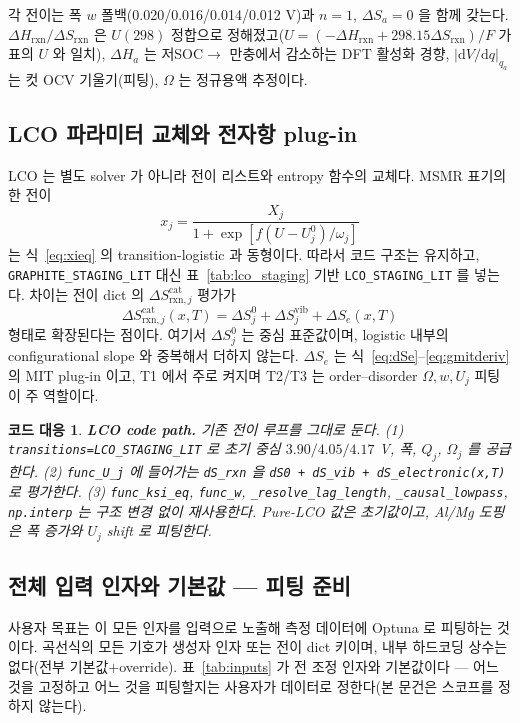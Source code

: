 \documentclass[11pt,a4paper]{article}
\newtheorem*{codebox}{코드 대응}
\newcommand{\dd}{\mathrm{d}}
\newcommand{\rxn}{\mathrm{rxn}}
\newcommand{\code}[1]{\texttt{#1}}
\begin{document}
각 전이는 폭 $w$ 폴백(0.020/0.016/0.014/0.012 V)과 $n=1$, $\Delta S_a=0$ 을 함께 갖는다. $\Delta H_\rxn/\Delta S_\rxn$
은 $U(298)$ 정합으로 정해졌고($U=(-\Delta H_\rxn+298.15\Delta S_\rxn)/F$ 가 표의 $U$ 와 일치), $\Delta H_a$ 는 저SOC$\to$
만충에서 감소하는 DFT 활성화 경향, $|\dd V/\dd q|_{q_a}$ 는 컷 OCV 기울기(피팅), $\Omega$ 는 정규용액 추정이다.

\subsection{LCO 파라미터 교체와 전자항 plug-in}
LCO 는 별도 solver 가 아니라 전이 리스트와 entropy 함수의 교체다. MSMR 표기의 한 전이
\begin{equation}
x_j=\frac{X_j}{1+\exp[f(U-U_j^0)/\omega_j]}
\label{eq:msmrhomology}
\end{equation}
는 식~\eqref{eq:xieq} 의 transition-logistic 과 동형이다. 따라서 코드 구조는 유지하고,
\code{GRAPHITE\_STAGING\_LIT} 대신 표~\ref{tab:lco_staging} 기반 \code{LCO\_STAGING\_LIT} 를 넣는다. 차이는
전이 dict 의 $\Delta S_{\rxn,j}^\mathrm{cat}$ 평가가
\begin{equation}
\Delta S_{\rxn,j}^\mathrm{cat}(x,T)
=\Delta S_j^0+\Delta S_j^\mathrm{vib}+\Delta S_e(x,T)
\label{eq:dScatcode}
\end{equation}
형태로 확장된다는 점이다. 여기서 $\Delta S_j^0$ 는 중심 표준값이며, logistic 내부의 configurational slope 와 중복해서
더하지 않는다. $\Delta S_e$ 는 식~\eqref{eq:dSe}--\eqref{eq:gmitderiv} 의 MIT plug-in 이고, T1 에서 주로 켜지며 T2/T3 는
order--disorder $\Omega,w,U_j$ 피팅이 주 역할이다.

\begin{codebox}
\textbf{LCO code path.} 기존 전이 루프를 그대로 둔다. (1) \code{transitions=LCO\_STAGING\_LIT} 로 초기 중심
$3.90/4.05/4.17$ V, 폭, $Q_j$, $\Omega_j$ 를 공급한다. (2) \code{func\_U\_j} 에 들어가는 \code{dS\_rxn} 을
\code{dS0 + dS\_vib + dS\_electronic(x,T)} 로 평가한다. (3) \code{func\_ksi\_eq}, \code{func\_w},
\code{\_resolve\_lag\_length}, \code{\_causal\_lowpass}, \code{np.interp} 는 구조 변경 없이 재사용한다. Pure-LCO 값은
초기값이고, Al/Mg 도핑은 폭 증가와 $U_j$ shift 로 피팅한다.
\end{codebox}

\subsection{전체 입력 인자와 기본값 — 피팅 준비}
사용자 목표는 이 모든 인자를 입력으로 노출해 측정 데이터에 Optuna 로 피팅하는 것이다. 곡선식의 모든 기호가 생성자 인자
또는 전이 dict 키이며, 내부 하드코딩 상수는 없다(전부 기본값$+$override). 표~\ref{tab:inputs} 가 전 조정 인자와
기본값이다 — 어느 것을 고정하고 어느 것을 피팅할지는 사용자가 데이터로 정한다(본 문건은 스코프를 정하지 않는다).
\end{document}
